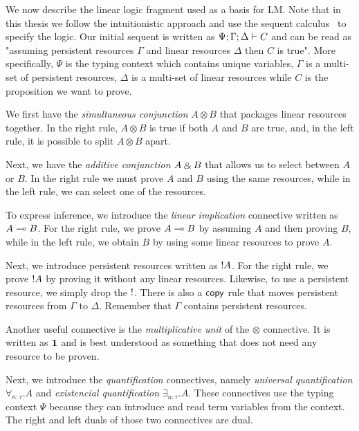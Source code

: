 We now describe the linear logic fragment used as a basis for LM.  Note that in
this thesis we follow the intuitionistic approach and use the sequent
calculus~\cite{gen35} to specify the logic. Our initial sequent is written as
$\Psi; \Gamma ; \Delta \vdash C$ and can be read as "assuming persistent
resources $\Gamma$ and linear resources $\Delta$ then $C$ is true".  More
specifically, $\Psi$ is the typing context which contains unique variables,
$\Gamma$ is a multi-set of persistent resources, $\Delta$ is a multi-set of
linear resources while $C$ is the proposition we want to prove.

We first have the \emph{simultaneous conjunction} $A \otimes B$ that packages
linear resources together. In the right rule, $A \otimes B$ is true if both $A$
and $B$ are true, and, in the left rule, it is possible to split $A \otimes B$
apart.



Next, we have the \emph{additive conjunction} $A \mathbin{\binampersand} B$ that allows us to
select between $A$ or $B$. In the right rule we must prove $A$ and $B$ using
the same resources, while in the left rule, we can select one of the
resources.



To express inference, we introduce the \emph{linear implication} connective
written as $A \multimap B$. For the right rule, we prove $A \multimap B$ by assuming
$A$ and then proving $B$, while in the left rule, we obtain $B$ by using some
linear resources to prove $A$.



Next, we introduce persistent resources written as ${!} A$. For the right
rule, we prove ${!} A$ by proving it without any linear resources. Likewise,
to use a persistent resource, we simply drop the $
{!}$. There is also a $\mathsf{copy}$ rule that moves persistent resources from
$\Gamma$ to $\Delta$. Remember that $\Gamma$ contains persistent resources.



Another useful connective is the \emph{multiplicative unit} of the $\otimes$
connective. It is written as $\mathbf{1}$ and is best understood as something that
does not need any resource to be proven.



Next, we introduce the \emph{quantification} connectives, namely \emph{universal
quantification} $\forall_{n:\tau}. A$ and \emph{existencial quantification}
$\exists_{n:\tau}. A$. These connectives use the typing context $\Psi$ because
they can introduce and read term variables from the context. The right and left duals of
those two connectives are dual.

